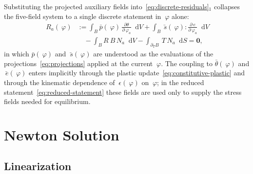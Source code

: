 \documentclass[12pt]{article}
\newcommand{\eps}{~\epsilon}
\newcommand{\edev}{~e}
\newcommand{\ebar}{\bar{~e}}
\newcommand{\sbar}{\bar{~s}}
\newcommand{\thbar}{\bar{\theta}}
\newcommand{\pbar}{\bar{p}}
\newcommand*\diff{\mathop{}\!\mathrm{d}}
\begin{document}
Substituting the projected auxiliary fields
into~\eqref{eq:discrete-residuals}$_1$ collapses the five-field
system to a single discrete statement in $~\varphi$ alone:
\begin{equation}
  \label{eq:reduced-statement}
  \begin{split}
    ~R_a(~\varphi) & :=
    \int_B \pbar(~\varphi) \, \frac{\partial \theta}{\partial ~\varphi_a} \diff V
    +
    \int_B \sbar(~\varphi) : \frac{\partial \edev}{\partial ~\varphi_a} \diff V
    \\
    & \quad
    -
    \int_B R ~B \, N_a \diff V
    -
    \int_{\partial_T B} ~T \, N_a \diff S
    = \mathbf{0},
  \end{split}
\end{equation}
in which $\pbar(~\varphi)$ and $\sbar(~\varphi)$ are understood as
the evaluations of the projections~\eqref{eq:projections} applied at
the current $~\varphi$. The coupling to $\thbar(~\varphi)$ and
$\ebar(~\varphi)$ enters implicitly through the plastic
update~\eqref{eq:constitutive-plastic} and through the kinematic
dependence of $\eps(~\varphi)$ on $~\varphi$; in the reduced
statement~\eqref{eq:reduced-statement} these fields are used only
to supply the stress fields needed for equilibrium.


\section{Newton Solution}
\label{sec:newton}

\subsection{Linearization}
\label{sec:linearization}
\end{document}
